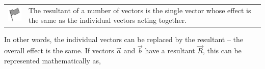 \label{m38813*fhsst!!!underscore!!!id269}\begin{definition}
	  \begin{tabular*}{15 cm}{m{15 mm}m{}}
	\hspace*{-50pt}  \includegraphics[width=0.5in]{col11305.imgs/psflag2.png}   & \Definition{   \label{id2512331}\textbf{ Resultant of Vectors }} { \label{m38813*meaningfhsst!!!underscore!!!id269}
        \label{m38813*id188362}The resultant of a number of vectors is the single vector whose effect is the same as the individual vectors acting together. \par 
         } 
      \end{tabular*}
      \end{definition}
        \label{m38813*id188374}In other words, the individual vectors can be replaced by the
resultant -- the overall effect is the same. If vectors $\stackrel{\to }{a}$ and $\stackrel{\to }{b}$ have a resultant $\stackrel{\to }{R}$, this can be represented mathematically as,\par 
        \label{m38813*id188427}\nopagebreak\noindent{}
          
